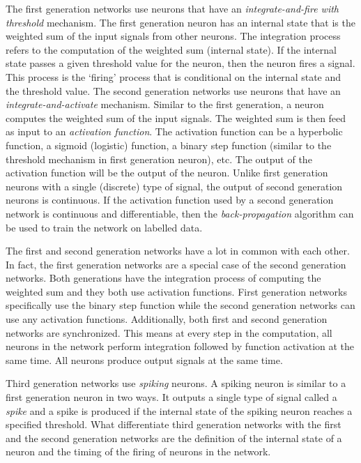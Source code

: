 \documentclass[12pt,A4]{article}
\begin{document}
The first generation networks use neurons that have an \emph{integrate-and-fire with threshold} 
mechanism. The first generation neuron has an internal state that is the weighted sum of the input
signals from other neurons. The integration process refers to the computation of the weighted sum
(internal state). If the internal state passes a given threshold value for the neuron, then the 
neuron fires a signal. This process is the `firing' process that is conditional on the internal 
state and the threshold value. The second generation networks use neurons that have an 
\emph{integrate-and-activate} mechanism. Similar to the first generation, a neuron computes the
weighted sum of the input signals. The weighted sum is then feed as input to an \emph{activation
function}. The activation function can be a hyperbolic function, a sigmoid (logistic) function, 
a binary step function (similar to the threshold mechanism in first generation neuron), etc. The
output of the activation function will be the output of the neuron. Unlike first generation 
neurons with a single (discrete) type of signal, the output of second generation neurons is 
continuous. If the activation function used by a second generation network is continuous and
differentiable, then the \emph{back-propagation} algorithm can be used to train the network on 
labelled data. 

The first and second generation networks have a lot in common with each other. In fact, the first
generation networks are a special case of the second generation networks. Both generations have
the integration process of computing the weighted sum and they both use activation functions. First
generation networks specifically use the binary step function while the second generation networks
can use any activation functions. Additionally, both first and second generation networks are 
synchronized. This means at every step in the computation, all neurons in the network perform 
integration followed by function activation at the same time. All neurons produce output signals
at the same time. 

Third generation networks use \emph{spiking} neurons. A spiking neuron is similar to a first 
generation neuron in two ways. It outputs a single type of signal called a \emph{spike} and a spike 
is produced if the internal state of the spiking neuron reaches a specified threshold. What 
differentiate third generation networks with the first and the second generation networks are the
definition of the internal state of a neuron and the timing of the firing of neurons in the network.
\end{document}
